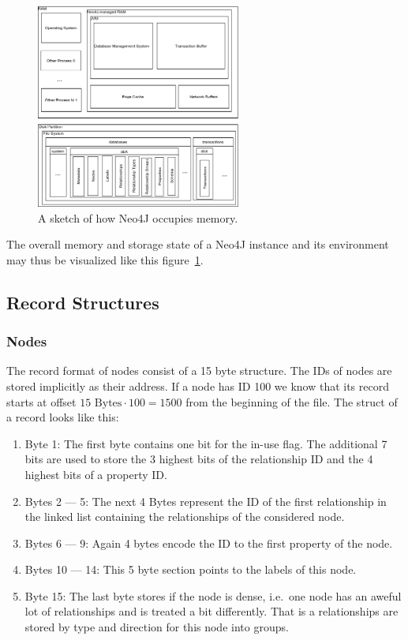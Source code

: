     \begin{figure}[htp]
    \begin{center}
    \includegraphics[keepaspectratio,width=0.6\textwidth]{img/00_intro/N4J_memory_view.png}
    \end{center}
    \caption{A sketch of how Neo4J occupies memory.}
    \label{N4J_memory_view}
    \end{figure}
    
    The overall memory and storage state of a Neo4J instance and its environment may thus be visualized like this figure~\ref{N4J_memory_view}.
    
    \subsection*{Record Structures}
        \subsubsection*{Nodes}
            The record format of nodes consist of a 15 byte structure.
            The IDs of nodes are stored implicitly as their address.
            If a node has ID 100 we know that its record starts at offset $15 \text{ Bytes} \cdot 100 = 1500$ from the beginning of the file.
            The struct of a record looks like this:
            \begin{enumerate}
                \item Byte 1: The first byte contains one bit for the in-use flag. 
                    The additional 7 bits are used to store the 3 highest bits of the relationship ID and the 4 highest bits of a property ID\@.
                \item Bytes 2 --- 5: The next 4 Bytes represent the ID of the first relationship in the linked list containing the relationships of the considered node.
                \item Bytes 6 --- 9: Again 4 bytes encode the ID to the first property of the node.
                \item Bytes 10 --- 14: This 5 byte section points to the labels of this node.
                \item Byte 15: The last byte stores if the node is dense, i.e.\ one node has an aweful lot of relationships and is treated a bit differently.
                    That is a relationships are stored by type and direction for this node into groups.
            \end{enumerate}
        
